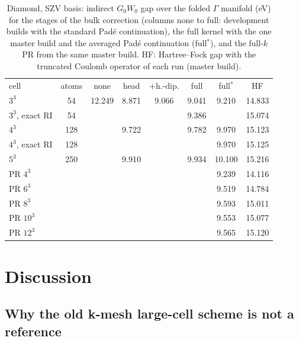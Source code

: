 \documentclass[%
 reprint,
superscriptaddress,
 amsmath,amssymb,
 aps,
prb,
]{revtex4-2}
\begin{document}
\begin{table}[h]
\caption{Diamond, SZV basis: indirect $G_0W_0$ gap over the folded $\Gamma$ manifold (eV) for
the stages of the bulk correction (columns none to full: development builds with the standard
Pad\'e continuation), the full kernel with the one master build and the averaged Pad\'e
continuation (full$^\ast$), and the full-$k$ PR from the same master build. HF: Hartree--Fock
gap with the truncated Coulomb operator of each run (master build).}
\label{tab:res3d}
\begin{ruledtabular}
\footnotesize
\begin{tabular}{lccccccc}
cell & atoms & none & head & +h.-dip. & full & full$^\ast$ & HF\\
\colrule
$3^3$ & 54  & 12.249 & 8.871 & 9.066 & 9.041 & 9.210 & 14.833\\
$3^3$, exact RI & 54 & & & & 9.386 & & 15.074\\
$4^3$ & 128 &        & 9.722 &       & 9.782 & 9.970 & 15.123\\
$4^3$, exact RI & 128 & & & & & 9.970 & 15.125\\
$5^3$ & 250 &        & 9.910 &       & 9.934 & 10.100 & 15.216\\
\colrule
PR $4^3$    & & & & & & 9.239 & 14.116\\
PR $6^3$    & & & & & & 9.519 & 14.784\\
PR $8^3$    & & & & & & 9.593 & 15.011\\
PR $10^3$   & & & & & & 9.553 & 15.077\\
PR $12^3$   & & & & & & 9.565 & 15.120\\
\end{tabular}
\end{ruledtabular}
\end{table}

\section{Discussion}
\label{sec:discussion}

\subsection{Why the old k-mesh large-cell scheme is not a reference}
\label{sec:oldscheme}
\end{document}
